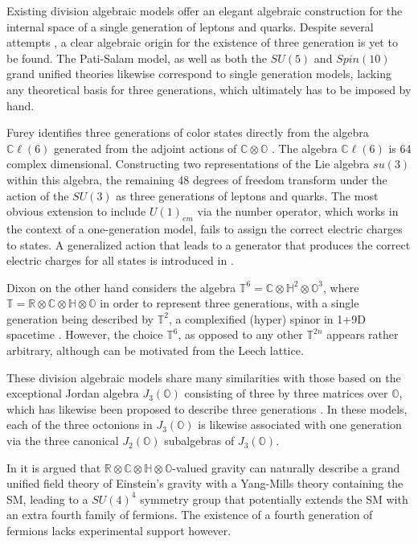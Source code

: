 \documentclass{article}
\newcommand{\bb}[1]{\mathbb{#1}}
\begin{document}
Existing division algebraic models offer an elegant algebraic construction for the internal space of a single generation of leptons and quarks. Despite several attempts \cite{dixon2013division,furey2014generations,gillard2019three}, a clear algebraic origin for the existence of three generation is yet to be found. The Pati-Salam model, as well as both the $SU(5)$ and $Spin(10)$ grand unified theories likewise correspond to single generation models, lacking any theoretical basis for three generations, which ultimately has to be imposed by hand.

Furey identifies three generations of color states directly from the algebra $\bb{C}\ell(6)$ generated from the adjoint actions of $\bb{C}\otimes\bb{O}$ \cite{furey2014generations}. The algebra $\bb{C}\ell(6)$ is 64 complex dimensional. Constructing two representations of the Lie algebra $su(3)$ within this algebra, the remaining 48 degrees of freedom transform under the action of the $SU(3)$ as three generations of leptons and quarks. The most obvious extension to include $U(1)_{em}$ via the number operator, which works in the context of a one-generation model, fails to assign the correct electric charges to states. A generalized action that leads to a generator that produces the correct electric charges for all states is introduced in \cite{furey2018three}.

Dixon on the other hand considers the algebra $\bb{T}^6=\bb{C}\otimes\bb{H}^2\otimes\bb{O}^3$, where $\bb{T}=\bb{R}\otimes\bb{C}\otimes\bb{H}\otimes\bb{O}$ in order to represent three generations, with a single generation being described by $\bb{T}^2$, a complexified (hyper) spinor in 1+9D spacetime \cite{dixon2004division}. However, the choice $\bb{T}^6$, as opposed to any other $\bb{T}^{2n}$ appears rather arbitrary, although can be motivated from the Leech lattice.

These division algebraic models share many similarities with those based on the exceptional Jordan algebra $J_3(\bb{O})$ consisting of three by three matrices over $\bb{O}$, which has likewise been proposed to describe three generations \cite{dubois2016exceptional,dubois2019exceptional,todorov2018octonions,todorov2018deducing,boyle2020standard2,boyle2020standard}. In these models, each of the three octonions in $J_3(\bb{O})$ is likewise associated with one generation via the three canonical $J_2(\bb{O})$ subalgebras of $J_3(\bb{O})$. 

In \cite{perelman2019r} it is argued that $\bb{R}\otimes\bb{C}\otimes\bb{H}\otimes\bb{O}$-valued gravity can naturally describe a grand unified field theory of Einstein's gravity with a Yang-Mills theory containing the SM, leading to a $SU(4)^4$ symmetry group that potentially extends the SM with an extra fourth family of fermions. The existence of a fourth generation of fermions lacks experimental support however.  
\end{document}
